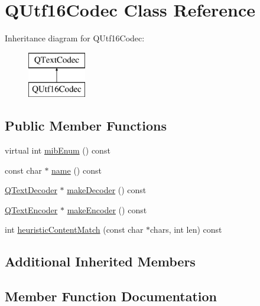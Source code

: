 \hypertarget{class_q_utf16_codec}{}\section{Q\+Utf16\+Codec Class Reference}
\label{class_q_utf16_codec}
Inheritance diagram for Q\+Utf16\+Codec\+:\begin{figure}[H]
\begin{center}
\leavevmode
\includegraphics[height=2.000000cm]{class_q_utf16_codec}
\end{center}
\end{figure}
\subsection*{Public Member Functions}
\begin{DoxyCompactItemize}
\item 
virtual int \mbox{\hyperlink{class_q_utf16_codec_aac5f0273efa632dd14125464094b581e}{mib\+Enum}} () const
\item 
const char $\ast$ \mbox{\hyperlink{class_q_utf16_codec_ab5bf550f93083d25bf13f5f7497088db}{name}} () const
\item 
\mbox{\hyperlink{class_q_text_decoder}{Q\+Text\+Decoder}} $\ast$ \mbox{\hyperlink{class_q_utf16_codec_a1134a8f386ac3b775ad60381e373d28a}{make\+Decoder}} () const
\item 
\mbox{\hyperlink{class_q_text_encoder}{Q\+Text\+Encoder}} $\ast$ \mbox{\hyperlink{class_q_utf16_codec_a09e6f9d5f05c5a7cf730841b28301ae5}{make\+Encoder}} () const
\item 
int \mbox{\hyperlink{class_q_utf16_codec_af33db3e4543fbeb677fd51366d237e2f}{heuristic\+Content\+Match}} (const char $\ast$chars, int len) const
\end{DoxyCompactItemize}
\subsection*{Additional Inherited Members}


\subsection{Member Function Documentation}
\mbox{\label{class_q_utf16_codec_af33db3e4543fbeb677fd51366d237e2f}} 
